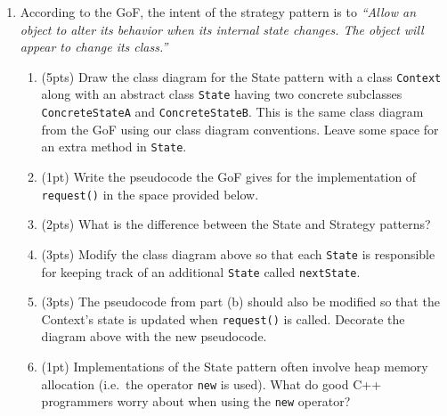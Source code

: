 \documentclass[11pt]{article}
\newlength{\up}\setlength{\up}{-\baselineskip}
\begin{document}
\begin{enumerate}

  \item According to the GoF, the intent of the strategy pattern is to \emph{``Allow an object to alter its behavior when its internal state changes. The object will appear to change its class.''}

  \begin{enumerate}

    \item (5pts) Draw the class diagram for the State pattern with a class \texttt{Context} along with an abstract class \texttt{State} having two concrete subclasses \texttt{ConcreteStateA} and \texttt{ConcreteStateB}. This is the same class diagram from the GoF using our class diagram conventions. Leave some space for an extra method in \texttt{State}.

    \vfill

    \item (1pt) Write the pseudocode the GoF gives for the implementation of \texttt{request()} in the space provided below.

    \vspace{0.5in}

    \item (2pts) What is the difference between the State and Strategy patterns?

    \vspace{1in}

    \item (3pts) Modify the class diagram above so that each \texttt{State} is responsible for keeping track of an additional \texttt{State} called \texttt{nextState}. 

    \item (3pts) The pseudocode from part (b) should also be modified so that the Context's state is updated when \texttt{request()} is called. Decorate the diagram above with the new pseudocode.  

    \item (1pt) Implementations of the State pattern often involve heap memory allocation (i.e.~the operator \texttt{new} is used). What do good C++ programmers worry about when using the \texttt{new} operator?

    \vspace{0.5in}

  \end{enumerate}

\newpage


\end{enumerate}
\end{document}
